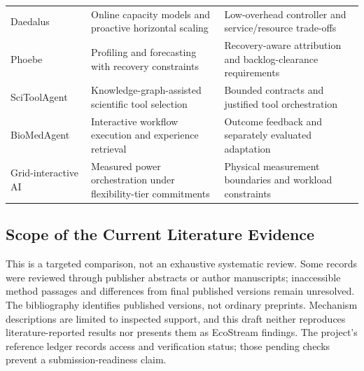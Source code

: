 \begin{table}[t]
\begin{tabularx}{\textwidth}{@{}p{} >{\raggedright\arraybackslash}X >{\raggedright\arraybackslash}X@{}}
Daedalus~\cite{pfister2024daedalus} & Online capacity models and proactive horizontal scaling & Low-overhead controller and service/resource trade-offs \\
Phoebe~\cite{geldenhuys2022phoebe} & Profiling and forecasting with recovery constraints & Recovery-aware attribution and backlog-clearance requirements \\
SciToolAgent~\cite{ding2025scitoolagent} & Knowledge-graph-assisted scientific tool selection & Bounded contracts and justified tool orchestration \\
BioMedAgent~\cite{bu2026biomedagent} & Interactive workflow execution and experience retrieval & Outcome feedback and separately evaluated adaptation \\
Grid-interactive AI~\cite{colangelo2026grid} & Measured power orchestration under flexibility-tier commitments & Physical measurement boundaries and workload constraints \\
\bottomrule
\end{tabularx}
\end{table}

\subsection{Scope of the Current Literature Evidence}
This is a targeted comparison, not an exhaustive systematic review. Some records were reviewed through publisher abstracts or author manuscripts; inaccessible method passages and differences from final published versions remain unresolved. The bibliography identifies published versions, not ordinary preprints. Mechanism descriptions are limited to inspected support, and this draft neither reproduces literature-reported results nor presents them as EcoStream findings. The project's reference ledger records access and verification status; those pending checks prevent a submission-readiness claim.
